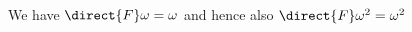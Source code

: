 \begin{corollary}
We have $\direct{F}\omega = \omega$ and hence also $\direct{F}\omega^2=\omega^2$
\end{corollary}





